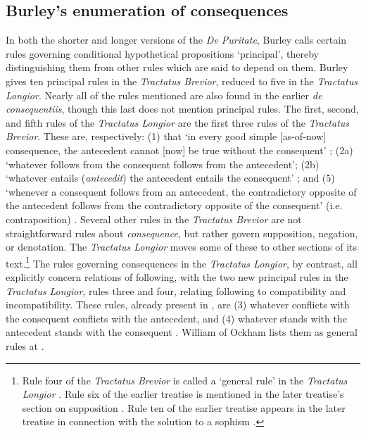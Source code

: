 \documentclass[]{birkjour}
\begin{document}
\subsection{Burley's enumeration of consequences}
In both the shorter and longer versions of the \textit{De Puritate}, Burley calls certain rules governing conditional hypothetical propositions `principal', thereby distinguishing them from other rules which are said to depend on them. Burley gives ten principal rules in the \textit{Tractatus Brevior}, reduced to five in the \textit{Tractatus Longior}. Nearly all of the rules mentioned are also found in the earlier \textit{de consequentiis}, though this last does not mention principal rules. The first, second, and fifth rules of the \textit{Tractatus Longior} are the first three rules of the \textit{Tractatus Brevior}. These are, respectively: (1) that `in every good simple [as-of-now] consequence, the antecedent cannot [now] be true without the consequent' \autocite[p. 61.30-37, 199.26-27]{BurleyDPAL}; (2a) `whatever follows from the consequent follows from the antecedent'; (2b) `whatever entails (\textit{antecedit}) the antecedent entails the consequent' \autocite[p. 62, 9-13]{BurleyDPAL}; and (5) `whenever a consequent follows from an antecedent, the contradictory opposite of the antecedent follows from the contradictory opposite of the consequent' (i.e. contraposition) \autocite[p. 64.20-22]{BurleyDPAL}. Several other rules in the \textit{Tractatus Brevior} are not straightforward rules about \textit{consequence}, but rather govern supposition, negation, or denotation. The \textit{Tractatus Longior} moves some of these to other sections of its text.\footnote{Rule four of the \textit{Tractatus Brevior} \autocite[p. 208.12-13]{BurleyDPAL} is called a `general rule' in the \textit{Tractatus Longior} \autocite[p. 73.29]{BurleyDPAL}. Rule six of the earlier treatise \autocite[p. 210.11-12]{BurleyDPAL} is mentioned in the later treatise's section on supposition \autocite[27.11]{BurleyDPAL}. Rule ten of the earlier treatise \autocite[p. 219.1-2]{BurleyDPAL} appears in the later treatise in connection with the solution to a sophism \autocite[p. 141.26-30]{BurleyDPAL}.} The rules governing consequences in the \textit{Tractatus Longior}, by contrast, all explicitly concern relations of following, with the two new principal rules in the \textit{Tractatus Longior}, rules three and four, relating following to compatibility and incompatibility. These rules, already present in \autocite[p. 133, par. 88]{Green-Pedersen1980b}, are (3) whatever conflicts with the consequent conflicts with the antecedent, and (4) whatever stands with the antecedent stands with the consequent \autocite[pp. 63.7-10, 64.20-22]{BurleyDPAL}. William of Ockham lists them as general rules at \autocite[III-3.38, pp. 727-731]{OckhamSL}.
\end{document}
